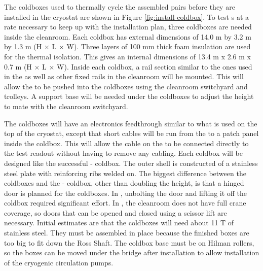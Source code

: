 The coldboxes used to thermally cycle the assembled  pairs before they are installed in the cryostat are shown in Figure \ref{fig:install-coldbox}. 
To test s at a rate necessary to keep up with the installation plan, three coldboxes are needed inside the cleanroom. 
Each coldbox has external dimensions of 14.0 \si{m} by 3.2 \si{m} by 1.3 \si{m} (H $\times$ L $\times$ W). 
Three layers of 100 \si{mm} thick foam insulation are used for the thermal isolation. 
This gives an internal dimensions of 13.4 \si{m} x 2.6 \si{m} x 0.7 \si{m} (H $\times$ L $\times$ W). 
Inside each coldbox, a rail section similar to the ones used in the  as well as other fixed rails in the cleanroom will be mounted.
This will allow the  to be pushed into the coldboxes using the cleanroom switchyard and trolleys. 
A support base will be needed under the coldboxes to adjust the height to mate with the cleanroom switchyard.

The coldboxes will have an electronics feedthrough similar to what is used on the top of the  cryostat, except that short cables will be run from the   to a patch panel inside the coldbox.
This will allow the cable on the  to be connected directly to the test readout without having to remove any cabling. 
Each coldbox will be designed like the successful - coldbox. 
The outer shell is constructed of a stainless steel plate with reinforcing ribs welded on. 
The biggest difference between the 
 coldboxes and the - coldbox, other than doubling the height, is that a hinged door is planned for the  coldboxes. 
In , unbolting the door and lifting it off the coldbox required significant effort. 
In , the cleanroom does not have full crane coverage, so doors that can be opened and closed using a scissor lift are necessary.
Initial estimates are that the  coldboxes will need about 11 \si{T} of stainless steel. 
They must be assembled in place because the finished boxes are too big to fit down the Ross Shaft. 
The coldbox base must be on Hilman rollers, so the boxes can be moved under the bridge after installation to allow installation of the cryogenic circulation pumps.
 





